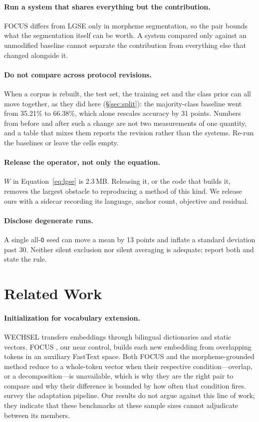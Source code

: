 \documentclass[11pt]{article}
\begin{document}
\paragraph{Run a system that shares everything but the contribution.} FOCUS
differs from LGSE only in morpheme segmentation, so the pair bounds what the
segmentation itself can be worth. A system compared only against an
unmodified baseline cannot separate the contribution from everything else
that changed alongside it.

\paragraph{Do not compare across protocol revisions.} When a corpus is
rebuilt, the test set, the training set and the class prior can all move
together, as they did here (\S\ref{sec:split}): the majority-class baseline
went from 35.21\% to 66.38\%, which alone rescales accuracy by 31 points.
Numbers from before and after such a change are not two measurements of one
quantity, and a table that mixes them reports the revision rather than the
systems. Re-run the baselines or leave the cells empty.

\paragraph{Release the operator, not only the equation.} $W$ in
Equation~\ref{eq:lgse} is 2.3\,MB. Releasing it, or the code that builds it,
removes the largest obstacle to reproducing a method of this kind. We release
ours with a sidecar recording its language, anchor count, objective and
residual.

\paragraph{Disclose degenerate runs.} A single all-\texttt{O} seed can move a
mean by 13 points and inflate a standard deviation past 30. Neither silent
exclusion nor silent averaging is adequate; report both and state the rule.

\section{Related Work}

\paragraph{Initialization for vocabulary extension.} WECHSEL
\citep{minixhofer-etal-2022-wechsel} transfers embeddings through bilingual
dictionaries and static vectors. FOCUS \citep{dobler-de-melo-2023-focus},
our near control, builds each new embedding from overlapping tokens in an
auxiliary FastText space. Both FOCUS and the morpheme-grounded method reduce
to a whole-token vector when their respective condition---overlap, or a
decomposition---is unavailable, which is why they are the right pair to
compare and why their difference is bounded by how often that condition
fires. \citet{csaki-etal-2023-efficiently} survey the adaptation pipeline.
Our results do not argue against this line of work; they indicate that these
benchmarks at these sample sizes cannot adjudicate between its members.
\end{document}
